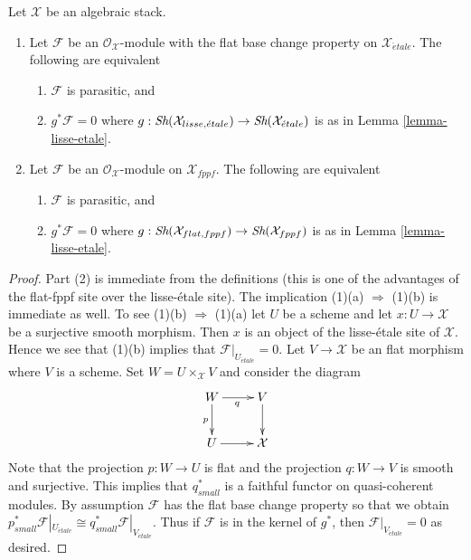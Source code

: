 \begin{lemma}
\label{lemma-parasitic-in-terms-flat-fppf}
Let $\mathcal{X}$ be an algebraic stack.
\begin{enumerate}
\item Let $\mathcal{F}$ be an $\mathcal{O}_\mathcal{X}$-module
with the flat base change property on $\mathcal{X}_{\acute{e}tale}$.
The following are equivalent
\begin{enumerate}
\item $\mathcal{F}$ is parasitic, and
\item $g^*\mathcal{F} = 0$ where
$g : \mathop{\textit{Sh}}\nolimits(\mathcal{X}_{lisse,\acute{e}tale}) \to
\mathop{\textit{Sh}}\nolimits(\mathcal{X}_{\acute{e}tale})$ is as in Lemma \ref{lemma-lisse-etale}.
\end{enumerate}
\item Let $\mathcal{F}$ be an $\mathcal{O}_\mathcal{X}$-module on
$\mathcal{X}_{fppf}$. The following are equivalent
\begin{enumerate}
\item $\mathcal{F}$ is parasitic, and
\item $g^*\mathcal{F} = 0$ where
$g :  \mathop{\textit{Sh}}\nolimits(\mathcal{X}_{flat,fppf}) \to \mathop{\textit{Sh}}\nolimits(\mathcal{X}_{fppf})$
is as in Lemma \ref{lemma-lisse-etale}.
\end{enumerate}
\end{enumerate}
\end{lemma}

\begin{proof}
Part (2) is immediate from the definitions (this is one of the advantages
of the flat-fppf site over the lisse-\'etale site). The implication
(1)(a) $\Rightarrow$ (1)(b) is immediate as well. To see (1)(b)
$\Rightarrow$ (1)(a) let $U$ be a scheme and let $x : U \to \mathcal{X}$
be a surjective smooth morphism. Then $x$ is an object of the
lisse-\'etale site of $\mathcal{X}$. Hence we see that (1)(b)
implies that $\mathcal{F}|_{U_{\acute{e}tale}} = 0$. Let $V \to \mathcal{X}$
be an flat morphism where $V$ is a scheme. Set $W = U \times_\mathcal{X} V$
and consider the diagram
$$
\xymatrix{
W \ar[d]_p \ar[r]_q & V \ar[d] \\
U \ar[r] & \mathcal{X}
}
$$
Note that the projection $p : W \to U$ is flat and the projection
$q : W \to V$ is smooth and surjective. This implies that $q_{small}^*$
is a faithful functor on quasi-coherent modules. By assumption $\mathcal{F}$
has the flat base change property so that we obtain
$p_{small}^*\mathcal{F}|_{U_{\acute{e}tale}} \cong
q_{small}^*\mathcal{F}|_{V_{\acute{e}tale}}$. Thus if $\mathcal{F}$
is in the kernel of $g^*$, then $\mathcal{F}|_{V_{\acute{e}tale}} = 0$
as desired.
\end{proof}

